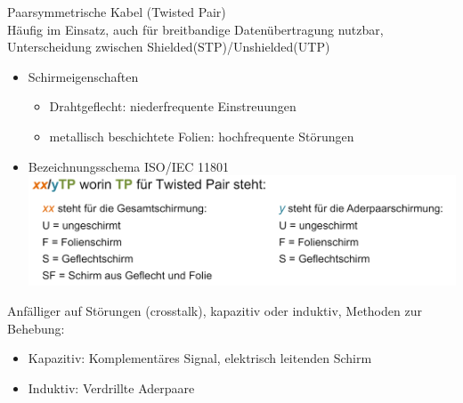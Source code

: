     \begin{definition}{Paarsymmetrische Kabel (Twisted Pair)}\\
        Häufig im Einsatz, auch für breitbandige Datenübertragung nutzbar, 
        Unterscheidung zwischen Shielded(STP)/Unshielded(UTP)
        \begin{itemize}
            \item Schirmeigenschaften
            \begin{itemize}
                \item Drahtgeflecht: niederfrequente Einstreuungen
                \item metallisch beschichtete Folien: hochfrequente Störungen
            \end{itemize}
            \item Bezeichnungsschema ISO/IEC 11801\\
            \includegraphics[width=\linewidth]{images/STP_Schirmeigenschaften.png}
        \end{itemize}
        Anfälliger auf Störungen (crosstalk), kapazitiv oder induktiv, Methoden zur Behebung:
        \begin{itemize}
            \item Kapazitiv: Komplementäres Signal, elektrisch leitenden Schirm
            \item Induktiv: Verdrillte Aderpaare
        \end{itemize}
    \end{definition}

